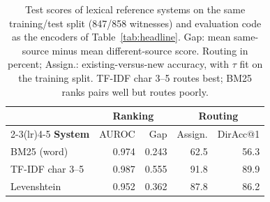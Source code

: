 \begin{table}[t]
\centering
\small
\setlength{\tabcolsep}{4pt}
\begin{tabular}{lrrrr}
\toprule
& \multicolumn{2}{c}{\textbf{Ranking}} & \multicolumn{2}{c}{\textbf{Routing}} \\
\cmidrule(lr){2-3}\cmidrule(lr){4-5}
\textbf{System} & AUROC & Gap & Assign. & DirAcc@1 \\
\midrule
BM25 (word) & 0.974 & 0.243 & 62.5 & 56.3 \\
TF-IDF char 3--5 & 0.987 & 0.555 & 91.8 & 89.9 \\
Levenshtein & 0.952 & 0.362 & 87.8 & 86.2 \\
\bottomrule
\end{tabular}
\caption{Test scores of lexical reference systems on the same training/test split (847/858 witnesses) and evaluation code as the encoders of Table~\ref{tab:headline}. Gap: mean same-source minus mean different-source score. Routing in percent; Assign.: existing-versus-new accuracy, with $\tau$ fit on the training split. TF-IDF char 3--5 routes best; BM25 ranks pairs well but routes poorly.}
\label{tab:lexical_baselines}
\end{table}
